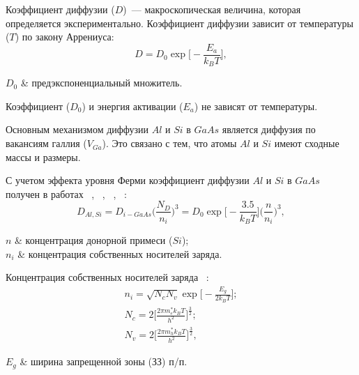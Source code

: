 
Коэффициент диффузии ($D$)~--- макроскопическая величина, которая определяется экспериментально. Коэффициент диффузии зависит от температуры ($T$) по закону Аррениуса:
\begin{equation}
	D = D_{0}\exp\bigg[-\frac{E_{a}}{k_{B}T}\bigg],
\end{equation}
\begin{conditions}
	$D_{0}$ & предэкспоненциальный множитель.
\end{conditions}
Коэффициент ($D_{0}$) и энергия активации ($E_{a}$) не зависят от температуры.

Основным механизмом диффузии $Al$ и $Si$ в $GaAs$ является диффузия по вакансиям галлия ($V_{Ga}$). Это связано с тем, что атомы $Al$ и $Si$ имеют сходные массы и размеры. 

С учетом эффекта уровня Ферми коэффициент диффузии $Al$ и $Si$ в $GaAs$ получен в работах ~\cite{getMeshkov}, ~\cite{Meshkov}, ~\cite{Meshkov}, ~\cite{Makeev}:
\begin{equation}
	D_{Al,Si} = D_{i-GaAs}\Big( \frac{N_{D}}{n_{i}} \Big)^{3} = D_{0}\exp\bigg[-\frac{3.5}{k_{B}T}\bigg]\Big( \frac{n}{n_{i}} \Big)^{3},
\end{equation}
\begin{conditions}
	$n$ & концентрация донорной примеси ($Si$);\\
	$n_{i}$ & концентрация собственных носителей заряда.
\end{conditions}

Концентрация собственных носителей заряда ~\cite{MFTIne}:
\begin{gather}
	n_{i} = \sqrt{N_{c}N_{v}}\exp\!\bigg[ - \frac{E_{g}}{2k_{B}T} \bigg];\\
	N_{c} = 2\Big[ \frac{2\pi m_{e}^{\ast}k_{B}T}{h^{2}} \Big]^{\frac{3}{2}};\\
	N_{v} = 2\Big[ \frac{2\pi m_{h}^{\ast}k_{B}T}{h^{2}} \Big]^{\frac{3}{2}},
\end{gather}
\begin{conditions}
	$E_{g}$ & ширина запрещенной зоны (ЗЗ) п/п.
\end{conditions}



